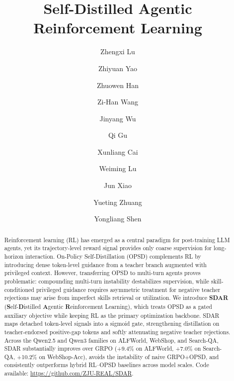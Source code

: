 \documentclass{llmxive}
\title{Self-Distilled Agentic Reinforcement Learning}
\author{Zhengxi Lu \and Zhiyuan Yao \and Zhuowen Han \and Zi-Han Wang \and Jinyang Wu \and Qi Gu \and Xunliang Cai \and Weiming Lu \and Jun Xiao \and Yueting Zhuang \and Yongliang Shen}
\providecommand{\methodname}{\textsc{SDAR}\xspace}
\begin{document}
\maketitle
\begin{abstract}
Reinforcement learning (RL) has emerged as a central paradigm for post-training LLM agents, yet its trajectory-level reward signal provides only coarse supervision for long-horizon interaction. 
On-Policy Self-Distillation (OPSD) complements RL by introducing dense token-level guidance from a teacher branch augmented with privileged context. 
However, transferring OPSD to multi-turn agents proves problematic: compounding multi-turn instability destabilizes supervision, while skill-conditioned privileged guidance requires asymmetric treatment for negative teacher rejections may arise from imperfect skills retrieval or utilization.
We introduce \textbf{SDAR} (\textbf{S}elf-\textbf{D}istilled \textbf{A}gentic \textbf{R}einforcement Learning), which treats OPSD as a gated auxiliary objective while keeping RL as the primary optimization backbone. 
\methodname{} maps detached token-level signals into a sigmoid gate, strengthening distillation on teacher-endorsed positive-gap tokens and softly attenuating negative teacher rejections. 
Across the Qwen2.5 and Qwen3 families on ALFWorld, WebShop, and Search-QA, \methodname{} substantially improves over GRPO (+9.4\% on ALFWorld, +7.0\% on Search-QA, +10.2\% on WebShop-Acc), avoids the instability of naive GRPO+OPSD, and consistently outperforms hybrid RL--OPSD baselines across model scales. Code available: \url{https://github.com/ZJU-REAL/SDAR}.


\end{abstract}
\end{document}
